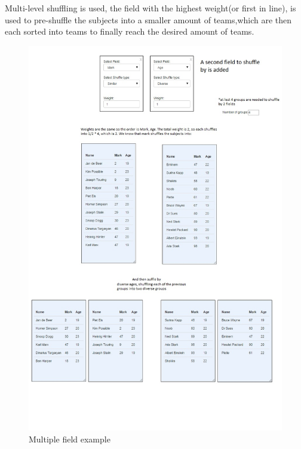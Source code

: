Multi-level shuffling is used, the field with the highest weight(or first in line),
is used to pre-shuffle the subjects into a smaller amount of teams,which are then each sorted into teams to finally reach the desired amount of teams.
  \par
 \begin{figure}[H] 
	\centering
	\includegraphics[width=16cm]{./graphics/multipleField.jpg}\par
	\caption{Multiple field example}
\end{figure}